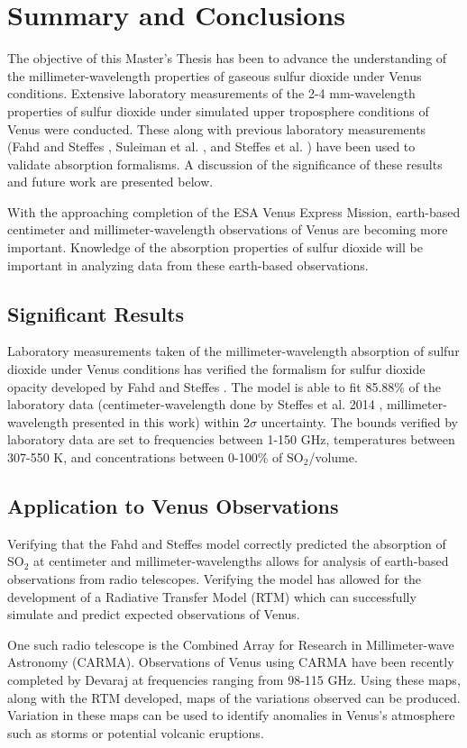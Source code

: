 \chapter{Summary and Conclusions}
The objective of this Master's Thesis has been to advance the understanding of the millimeter-wavelength properties of gaseous sulfur dioxide under Venus conditions. Extensive laboratory measurements of the 2-4 mm-wavelength properties of sulfur dioxide under simulated upper troposphere conditions of Venus were conducted. These along with previous laboratory measurements (Fahd and Steffes \cite{Fahd-1991}, Suleiman et al. \cite{Suleiman-1996}, and Steffes et al. \cite{Steffes-2014}) have been used to validate absorption formalisms. A discussion of the significance of these results and future work are presented below. 

With the approaching completion of the ESA Venus Express Mission, earth-based centimeter and millimeter-wavelength observations of Venus are becoming more important. Knowledge of the absorption properties of sulfur dioxide will be important in analyzing data from these earth-based observations. 
\section{Significant Results}

Laboratory measurements taken of the millimeter-wavelength absorption of sulfur dioxide under Venus conditions has verified the formalism for sulfur dioxide opacity developed by Fahd and Steffes \cite{Fahd-1991}. The model is able to fit 85.88\% of the laboratory data (centimeter-wavelength done by Steffes et al. 2014 \cite{Steffes-2014}, millimeter-wavelength presented in this work) within $2\sigma$ uncertainty. The bounds verified by laboratory data are set to frequencies between 1-150 GHz, temperatures between 307-550 K, and concentrations between 0-100\% of SO$_2$/volume. 
\section{Application to Venus Observations}
Verifying that the Fahd and Steffes \cite{Fahd-1991} model correctly predicted the absorption of SO$_2$ at centimeter and millimeter-wavelengths allows for analysis of earth-based observations from radio telescopes. Verifying the model has allowed for the development of a Radiative Transfer Model (RTM) which can successfully simulate and predict expected observations of Venus. 

One such radio telescope is the Combined Array for Research in Millimeter-wave Astronomy (CARMA). Observations of Venus using CARMA have been recently completed by Devaraj \cite{Devaraj-CARMA} at frequencies ranging from 98-115 GHz. Using these maps, along with the RTM developed, maps of the variations observed can be produced. Variation in these maps can be used to identify anomalies in Venus's atmosphere such as storms or potential volcanic eruptions.

